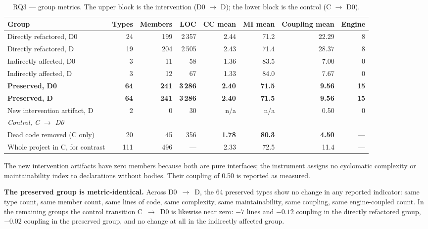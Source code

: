 \documentclass{sbc2019}%
\begin{document}
\begin{table}[!tp]
\centering
\caption{RQ3 --- group metrics. The upper block is the intervention
(D0 $\rightarrow$ D); the lower block is the control (C $\rightarrow$ D0).}\label{tab:rq3metrics}
\small
\begin{tabular}{lrrrrrrr}
\toprule
\textbf{Group} & \textbf{Types} & \textbf{Members} & \textbf{LOC} & \textbf{CC mean} & \textbf{MI mean} & \textbf{Coupling mean} & \textbf{Engine} \\
\midrule
Directly refactored, D0   & 24 & 199 & 2\,357 & 2.44 & 71.2 & 22.29 & 8 \\
Directly refactored, D    & 19 & 204 & 2\,505 & 2.43 & 71.4 & 28.37 & 8 \\
\addlinespace
Indirectly affected, D0   & 3  & 11  & 58    & 1.36 & 83.5 & 7.00  & 0 \\
Indirectly affected, D    & 3  & 12  & 67    & 1.33 & 84.0 & 7.67  & 0 \\
\addlinespace
\textbf{Preserved, D0}    & \textbf{64} & \textbf{241} & \textbf{3\,286} & \textbf{2.40} & \textbf{71.5} & \textbf{9.56} & \textbf{15} \\
\textbf{Preserved, D}     & \textbf{64} & \textbf{241} & \textbf{3\,286} & \textbf{2.40} & \textbf{71.5} & \textbf{9.56} & \textbf{15} \\
\addlinespace
New intervention artifact, D & 2 & 0 & 30 & n/a & n/a & 0.50 & 0 \\
\midrule
\multicolumn{8}{l}{\emph{Control, C $\rightarrow$ D0}} \\
Dead code removed (C only) & 20 & 45  & 356 & \textbf{1.78} & \textbf{80.3} & \textbf{4.50} & --- \\
Whole project in C, for contrast & 111 & 496 & --- & 2.33 & 72.5 & 11.4 & --- \\
\bottomrule
\end{tabular}
\end{table}

The new intervention artifacts have zero members because both are pure
interfaces; the instrument assigns no cyclomatic complexity or maintainability
index to declarations without bodies. Their coupling of 0.50 is reported as
measured.

\medskip\noindent\textbf{The preserved group is metric-identical.} Across
D0~$\rightarrow$~D, the 64 preserved types show no change in any reported
indicator: same type count, same member count, same lines of code, same
complexity, same maintainability, same coupling, same engine-coupled count. In
the remaining groups the control transition C~$\rightarrow$~D0 is likewise near
zero: $-7$ lines and $-0.12$ coupling in the directly refactored group, $-0.02$
coupling in the preserved group, and no change at all in the indirectly affected
group.
\end{document}
